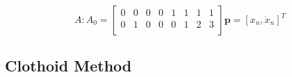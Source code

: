 \begin{equation}
A : A_0 = \left[ \begin{matrix}
0 & 0 & 0 & 0 & 1 & 1 & 1 & 1 \\
0 & 1 & 0 & 0 & 0 & 1 & 2 & 3 \\
\end{matrix}\right] \bm{p} = [x_n, \dot{x}_n]^T 
\label{eq:submatrix_end}
\end{equation}



\subsection{Clothoid Method}
